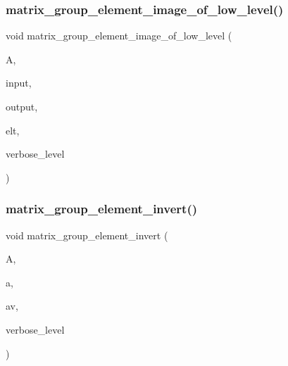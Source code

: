 \subsubsection{\texorpdfstring{matrix\+\_\+group\+\_\+element\+\_\+image\+\_\+of\+\_\+low\+\_\+level()}{matrix\_group\_element\_image\_of\_low\_level()}}
{\footnotesize\ttfamily void matrix\+\_\+group\+\_\+element\+\_\+image\+\_\+of\+\_\+low\+\_\+level (\begin{DoxyParamCaption}\item[{\mbox{\hyperlink{classaction}{action}} \&}]{A,  }\item[{\mbox{\hyperlink{galois_8h_a09fddde158a3a20bd2dcadb609de11dc}{I\+NT}} $\ast$}]{input,  }\item[{\mbox{\hyperlink{galois_8h_a09fddde158a3a20bd2dcadb609de11dc}{I\+NT}} $\ast$}]{output,  }\item[{void $\ast$}]{elt,  }\item[{\mbox{\hyperlink{galois_8h_a09fddde158a3a20bd2dcadb609de11dc}{I\+NT}}}]{verbose\+\_\+level }\end{DoxyParamCaption})}

\mbox{\label{interface__matrix__group_8_c_a7b91b9be761ab433dc1979fba0ff4885}} 
\subsubsection{\texorpdfstring{matrix\+\_\+group\+\_\+element\+\_\+invert()}{matrix\_group\_element\_invert()}}
{\footnotesize\ttfamily void matrix\+\_\+group\+\_\+element\+\_\+invert (\begin{DoxyParamCaption}\item[{\mbox{\hyperlink{classaction}{action}} \&}]{A,  }\item[{void $\ast$}]{a,  }\item[{void $\ast$}]{av,  }\item[{\mbox{\hyperlink{galois_8h_a09fddde158a3a20bd2dcadb609de11dc}{I\+NT}}}]{verbose\+\_\+level }\end{DoxyParamCaption})}

\mbox{\label{interface__matrix__group_8_c_a41e2c457ec60d1c9ffb10a71362390a1}} 
